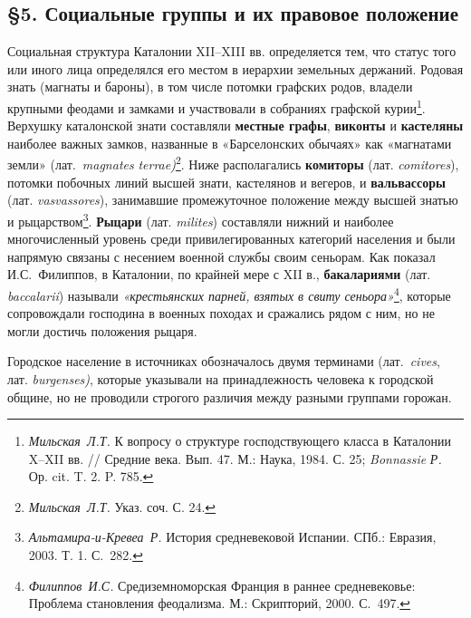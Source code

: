 \subsection*{§5. Социальные группы и их правовое положение}

Социальная структура Каталонии XII--XIII вв. определяется тем, что статус того или иного лица определялся его местом в иерархии земельных держаний. Родовая знать (магнаты и бароны), в том числе потомки графских родов, владели крупными феодами и замками и участвовали в собраниях графской курии\footnote{\emph{Мильская}\emph{~}\emph{Л}\emph{.}\emph{Т}\emph{.} К вопросу о структуре господствующего класса в Каталонии X--XII вв. // Средние века. Вып. 47. М.: Наука, 1984. С. 25; \emph{Bonnassie }\emph{Р}\emph{. }Ор. cit. T. 2. P. 785.}. Верхушку каталонской знати составляли \textbf{местные графы}, \textbf{виконты} и \textbf{кастеляны} наиболее важных замков, названные в «Барселонских обычаях» как «магнатами земли» (лат.~\emph{magnates}\emph{ }\emph{terrae}\emph{)}\footnote{\emph{Мильская}\emph{~}\emph{Л.Т.} Указ. соч. С. 24.}. Ниже располагались \textbf{комиторы}\textbf{ }(лат. \emph{comitores}),\textbf{ }потомки побочных линий высшей знати, кастелянов и вегеров, и \textbf{вальвассоры}\textbf{ }(лат. \emph{vasvassores}), занимавшие промежуточное положение между высшей знатью и рыцарством\footnote{\emph{Альтамира}\emph{-и-}\emph{Кревеа}\emph{~}\emph{Р.} История средневековой Испании. СПб.: Евразия, 2003. Т. 1. С.~282.}. \textbf{Рыцари} (лат. \emph{milites}) составляли нижний и наиболее многочисленный уровень среди привилегированных категорий населения и были напрямую связаны с несением военной службы своим сеньорам. Как показал И.С.~Филиппов, в Каталонии, по крайней мере с XII в., \textbf{бакалари}\textbf{ями} (лат. \emph{baccalarii}) называли \emph{«крестьянских парней, взятых в свиту сеньора»}\footnote{\emph{Филиппов~И.С.} Средиземноморская Франция в раннее средневековье: Проблема становления феодализма. М.: Скрипторий, 2000. С.~497.}, которые сопровождали господина в военных походах и сражались рядом с ним, но не могли достичь положения рыцаря.

Городское население в источниках обозначалось двумя терминами (лат.~\emph{cives}, лат. \emph{burgenses}\emph{)}, которые указывали на принадлежность человека к городской общине, но не проводили строгого различия между разными группами горожан.

